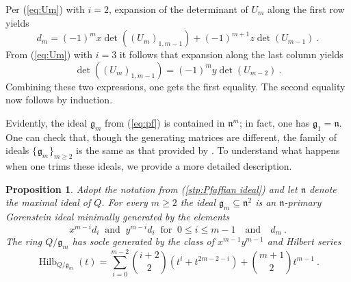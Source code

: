 \documentclass{amsart}
\theoremstyle{bfupright head,upright body}
\theoremstyle{fixed bf head,slanted body}
\newtheorem{prp}[res]{Proposition}      \newtheorem*{prp*}{Proposition}
\theoremstyle{fixed bf head,upright body}
\theoremstyle{numbered paragraph}
\newenvironment{prf*}[1][Proof]{%
  \begin{proof}[\bf #1]
    \setcounter{equation}{0}
    \renewcommand{\theequation}{\arabic{equation}}}
  {\end{proof}
}
\renewcommand{\eqref}[1]{\pgref{eq:#1}}
\newcommand{\pgref}[1]{(\ref{#1})}
\newcommand{\prpcite}[2][?]{\cite[prop.~#1]{#2}}
\newcommand{\set}[2][\mspace{1mu}]{\{#1 #2 #1\}}
\newcommand{\qtext}[1]{\quad\text{#1}\quad}
\newcommand{\qand}{\qtext{and}}
\newcommand{\n}{\mathfrak{n}}
\newcommand{\Hilb}[1]{\operatorname{Hilb}_{#1}(t)}
\newcommand{\fg}{\mathfrak{g}}
\numberwithin{equation}{res}
\begin{document}
\begin{prf*}
  Per \eqref{Um} with $i=2$, expansion of the determinant of $U_m$
  along the first row yields
  \begin{equation*}
    d_m = (-1)^mx\det((U_m)_{1,m-1}) + (-1)^{m+1}z\det (U_{m-1})\:.
  \end{equation*}
  From \eqref{Um} with $i=3$ it follows that expansion along the last
  column yields
  \begin{equation*}
    \det((U_m)_{1,m-1}) = (-1)^my\det (U_{m-2})\:.
  \end{equation*}
  Combining these two expressions, one gets the first equality. The
  second equality now follows by induction.
\end{prf*}

Evidently, the ideal $\fg_m$ from \eqref{pf} is contained in $\n^m$;
in fact, one has $\fg_1 = \n$. One can check that, though the
generating matrices are different, the family of ideals
$\set{\fg_m}_{m\ge 2}$ is the same as that provided by
\prpcite[6.2]{DABDEs77}. To understand what happens when one trims
these ideals, we provide a more detailed description.

\begin{prp}
  \label{prp:dPfaffian ideal}
  Adopt the notation from {\rm \pgref{stp:Pfaffian ideal}} and let
  $\n$ denote the maximal ideal of $Q$. For every $m\ge 2$ the ideal
  $\fg_m \subseteq \n^2$ is an $\n$-primary Gorenstein ideal minimally
  generated by the elements
  \begin{equation*}
    x^{m-i}d_i \ \text{ and } \ y^{m-i}d_i \ \text{ for } \ 
    0 \le i \le m-1\qand d_m\:.
  \end{equation*}
  The ring $Q/\fg_m$ has socle generated by the class of
  $x^{m-1}y^{m-1}$ and Hilbert series
  \begin{equation*}
    \Hilb{Q/\fg_m} = \sum_{i=0}^{m-2} \binom{i+2}{2}\left (t^i+t^{2m-2-i}\right) 
    + \binom {m+1}{2}t^{m-1}\:.
  \end{equation*}
\end{prp}
\end{document}
